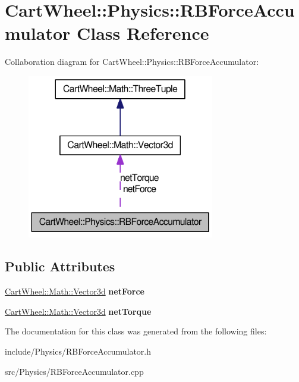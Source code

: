 \hypertarget{classCartWheel_1_1Physics_1_1RBForceAccumulator}{
\section{CartWheel::Physics::RBForceAccumulator Class Reference}
\label{classCartWheel_1_1Physics_1_1RBForceAccumulator}
}


Collaboration diagram for CartWheel::Physics::RBForceAccumulator:\nopagebreak
\begin{figure}[H]
\begin{center}
\leavevmode
\includegraphics[width=232pt]{classCartWheel_1_1Physics_1_1RBForceAccumulator__coll__graph}
\end{center}
\end{figure}
\subsection*{Public Attributes}
\begin{DoxyCompactItemize}
\item 
\hypertarget{classCartWheel_1_1Physics_1_1RBForceAccumulator_accdafd452c4e2f345e488be705b09308}{
\hyperlink{classCartWheel_1_1Math_1_1Vector3d}{CartWheel::Math::Vector3d} {\bfseries netForce}}
\label{classCartWheel_1_1Physics_1_1RBForceAccumulator_accdafd452c4e2f345e488be705b09308}

\item 
\hypertarget{classCartWheel_1_1Physics_1_1RBForceAccumulator_a087dbcb3a6069a4b3aad2447eeb8a8e1}{
\hyperlink{classCartWheel_1_1Math_1_1Vector3d}{CartWheel::Math::Vector3d} {\bfseries netTorque}}
\label{classCartWheel_1_1Physics_1_1RBForceAccumulator_a087dbcb3a6069a4b3aad2447eeb8a8e1}

\end{DoxyCompactItemize}


The documentation for this class was generated from the following files:\begin{DoxyCompactItemize}
\item 
include/Physics/RBForceAccumulator.h\item 
src/Physics/RBForceAccumulator.cpp\end{DoxyCompactItemize}

